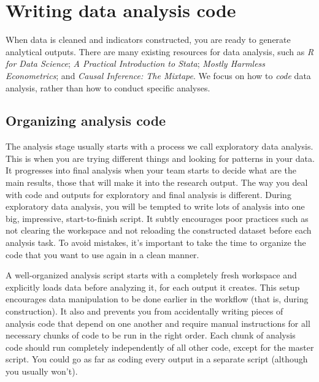 
\section{Writing data analysis code}

When data is cleaned and indicators constructed, you are ready to generate analytical outputs.
There are many existing resources for data analysis, such as
\textit{R for Data Science};
\textit{A Practical Introduction to Stata};
\textit{Mostly Harmless Econometrics};
and \textit{Causal Inference: The Mixtape}.
We focus on how to \textit{code} data analysis, rather than how to conduct specific analyses.

\subsection{Organizing analysis code}

The analysis stage usually starts with a process we call exploratory data analysis.
This is when you are trying different things and looking for patterns in your data.
It progresses into final analysis when your team starts to decide what are the main results,
those that will make it into the research output.
The way you deal with code and outputs for exploratory and final analysis is different.
During exploratory data analysis,
you will be tempted to write lots of analysis into one big, impressive, start-to-finish script.
It subtly encourages poor practices such as not clearing the workspace and not reloading the constructed dataset before each analysis task.
To avoid mistakes, it's important to take the time
to organize the code that you want to use again in a clean manner.

A well-organized analysis script starts with a completely fresh workspace
and explicitly loads data before analyzing it, for each output it creates.
This setup encourages data manipulation to be done earlier in the workflow
(that is, during construction).
It also and prevents you from accidentally writing pieces of analysis code that depend on one another
and require manual instructions for all necessary chunks of code to be run in the right order.
Each chunk of analysis code should run completely independently of all other code,
except for the master script.
You could go as far as coding every output in a separate script (although you usually won't).

